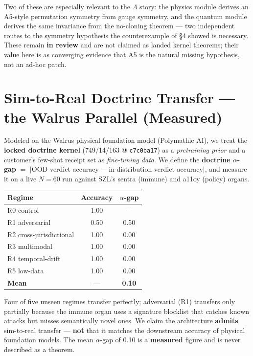 \documentclass[11pt]{article}
\theoremstyle{plain}
\theoremstyle{definition}
\theoremstyle{remark}
\newcommand{\La}{\Lambda}
\begin{document}
Two of these are especially relevant to the $\La$ story: the physics module derives
an A5-style permutation symmetry from gauge symmetry, and the quantum module derives
the same invariance from the no-cloning theorem --- two independent routes to the
symmetry hypothesis the counterexample of \S4 showed is necessary. These remain
\textbf{in review} and are not claimed as landed kernel theorems; their value here is
as converging evidence that A5 is the natural missing hypothesis, not an ad-hoc
patch.

\section{Sim-to-Real Doctrine Transfer --- the Walrus Parallel (Measured)}

Modeled on the Walrus physical foundation model (Polymathic AI), we treat the
\textbf{locked doctrine kernel} (749/14/163 @ \texttt{c7c0ba17}) as a
\emph{pretraining prior} and a customer's few-shot receipt set as \emph{fine-tuning
data}. We define the \textbf{doctrine $\alpha$-gap} $=$ $|$OOD verdict accuracy $-$
in-distribution verdict accuracy$|$, and measure it on a live $N=60$ run against
SZL's sentra (immune) and a11oy (policy) organs.

\begin{center}
\begin{tabular}{@{}lcc@{}}
\toprule
\textbf{Regime} & \textbf{Accuracy} & \textbf{$\alpha$-gap} \\
\midrule
R0 control & 1.00 & --- \\
R1 adversarial & 0.50 & 0.50 \\
R2 cross-jurisdictional & 1.00 & 0.00 \\
R3 multimodal & 1.00 & 0.00 \\
R4 temporal-drift & 1.00 & 0.00 \\
R5 low-data & 1.00 & 0.00 \\
\textbf{Mean} & --- & \textbf{0.10} \\
\bottomrule
\end{tabular}
\end{center}

Four of five unseen regimes transfer perfectly; adversarial (R1) transfers only
partially because the immune organ uses a signature blocklist that catches known
attacks but misses semantically novel ones. We claim the architecture \textbf{admits}
sim-to-real transfer --- \textbf{not} that it matches the downstream accuracy of
physical foundation models. The mean $\alpha$-gap of 0.10 is a \textbf{measured}
figure and is never described as a theorem.
\end{document}
